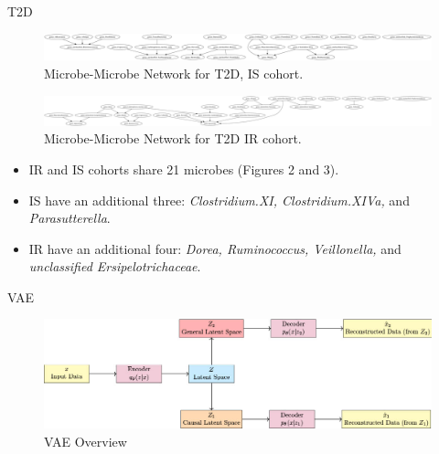 \documentclass[final]{beamer}
\newlength{\colwidth}
\begin{document}
\begin{frame}[t]
\begin{columns}[t]
\begin{column}{\colwidth}
\begin{block}{T2D}
    
    
    \vspace{1cm}
    
    \begin{figure}
    	\centering
	\includegraphics[width=\linewidth]{../graphs/t2d/glasso_IS_norm.png}
	\caption{Microbe-Microbe Network for T2D, IS cohort.}
    \end{figure}
    
    \begin{figure}
	\includegraphics[width=\linewidth]{../graphs/t2d/glasso_IR_norm.png}
	\caption{Microbe-Microbe Network for T2D IR cohort.}
    \end{figure}
    
    \begin{itemize}
    	\item IR and IS cohorts share 21 microbes (Figures 2 and 3).
	\item IS have an additional three: \textit{Clostridium.XI, Clostridium.XIVa,} and \textit{Parasutterella}.
	\item IR have an additional four: \textit{Dorea, Ruminococcus, Veillonella,} and \textit{unclassified Ersipelotrichaceae}. 
    \end{itemize}
  \end{block}

\vspace{0.5cm}
  \begin{block}{VAE}
    \begin{figure}[ht]
      \centering
      \includegraphics[width=\linewidth]{modified_vae.jpg} %
      \caption{VAE Overview}
      \label{fig:baseline_vae}
    \end{figure}


\end{block}
\end{column}
\end{columns}
\end{frame}
\end{document}
